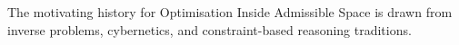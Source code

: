 The motivating history for Optimisation Inside Admissible Space is drawn from inverse problems, cybernetics, and constraint-based reasoning traditions.
